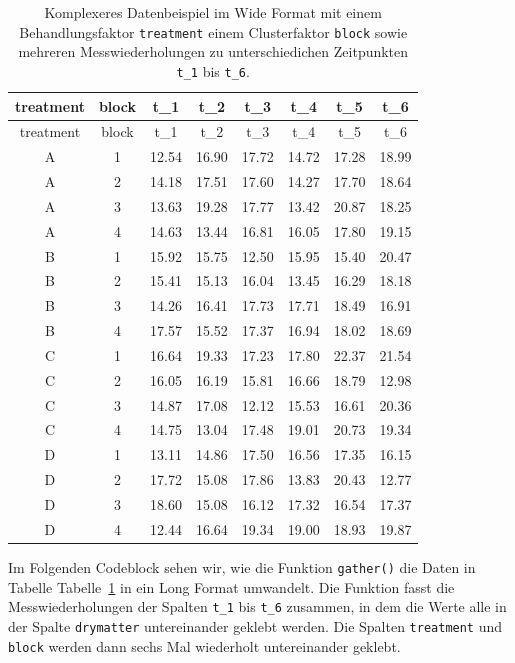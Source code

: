 \documentclass[
  letterpaper,
]{scrbook}
\begin{document}
\hypertarget{tbl-imp-complex-long}{}
\begin{longtable}[]{@{}cccccccc@{}}
\caption{\label{tbl-imp-complex-long}Komplexeres Datenbeispiel im Wide
Format mit einem Behandlungsfaktor \texttt{treatment} einem
Clusterfaktor \texttt{block} sowie mehreren Messwiederholungen zu
unterschiedichen Zeitpunkten \texttt{t\_1} bis
\texttt{t\_6}.}\tabularnewline
\toprule()
treatment & block & t\_1 & t\_2 & t\_3 & t\_4 & t\_5 & t\_6 \\
\midrule()
\endfirsthead
\toprule()
treatment & block & t\_1 & t\_2 & t\_3 & t\_4 & t\_5 & t\_6 \\
\midrule()
\endhead
A & 1 & 12.54 & 16.90 & 17.72 & 14.72 & 17.28 & 18.99 \\
A & 2 & 14.18 & 17.51 & 17.60 & 14.27 & 17.70 & 18.64 \\
A & 3 & 13.63 & 19.28 & 17.77 & 13.42 & 20.87 & 18.25 \\
A & 4 & 14.63 & 13.44 & 16.81 & 16.05 & 17.80 & 19.15 \\
B & 1 & 15.92 & 15.75 & 12.50 & 15.95 & 15.40 & 20.47 \\
B & 2 & 15.41 & 15.13 & 16.04 & 13.45 & 16.29 & 18.18 \\
B & 3 & 14.26 & 16.41 & 17.73 & 17.71 & 18.49 & 16.91 \\
B & 4 & 17.57 & 15.52 & 17.37 & 16.94 & 18.02 & 18.69 \\
C & 1 & 16.64 & 19.33 & 17.23 & 17.80 & 22.37 & 21.54 \\
C & 2 & 16.05 & 16.19 & 15.81 & 16.66 & 18.79 & 12.98 \\
C & 3 & 14.87 & 17.08 & 12.12 & 15.53 & 16.61 & 20.36 \\
C & 4 & 14.75 & 13.04 & 17.48 & 19.01 & 20.73 & 19.34 \\
D & 1 & 13.11 & 14.86 & 17.50 & 16.56 & 17.35 & 16.15 \\
D & 2 & 17.72 & 15.08 & 17.86 & 13.83 & 20.43 & 12.77 \\
D & 3 & 18.60 & 15.08 & 16.12 & 17.32 & 16.54 & 17.37 \\
D & 4 & 12.44 & 16.64 & 19.34 & 19.00 & 18.93 & 19.87 \\
\bottomrule()
\end{longtable}

Im Folgenden Codeblock sehen wir, wie die Funktion \texttt{gather()} die
Daten in Tabelle Tabelle~\ref{tbl-imp-complex-long} in ein Long Format
umwandelt. Die Funktion fasst die Messwiederholungen der Spalten
\texttt{t\_1} bis \texttt{t\_6} zusammen, in dem die Werte alle in der
Spalte \texttt{drymatter} untereinander geklebt werden. Die Spalten
\texttt{treatment} und \texttt{block} werden dann sechs Mal wiederholt
untereinander geklebt.
\end{document}
